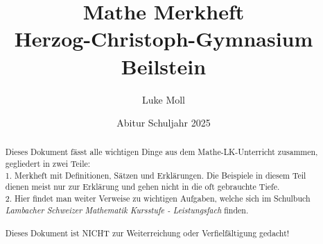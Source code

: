 \documentclass[12pt,a4paper]{report}
\title{Mathe Merkheft
{\\\Large Herzog-Christoph-Gymnasium Beilstein}}
\author{Luke Moll}
\date{Abitur Schuljahr 2025}
\begin{document}
\newtheorem{satz}{Satz}
\newtheorem{definition}{Definition}
\maketitle
\begin{abstract}
    Dieses Dokument fässt alle wichtigen Dinge aus dem Mathe-LK-Unterricht zusammen, gegliedert in zwei Teile: \\ 1. Merkheft mit Definitionen, Sätzen und Erklärungen. Die Beispiele in diesem Teil dienen meist nur zur Erklärung und gehen nicht in die oft gebrauchte Tiefe. \\ 2. Hier findet man weiter Verweise zu wichtigen Aufgaben, welche sich im Schulbuch \textit{Lambacher Schweizer Mathematik Kursstufe - Leistungsfach} finden.\\
    \ \\
    Dieses Dokument ist NICHT zur Weiterreichung oder Verfielfältigung gedacht!
\end{abstract}
\tableofcontents
\vspace{2cm} %







\end{document}
